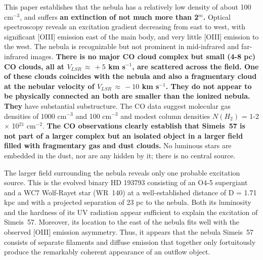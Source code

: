 \documentclass{aa}
\begin{document}
This paper establishes that the nebula has a relatively low density of
about 100 cm$^{-3 }$, and suffers {\bf an extinction of not much more
  than 2$^{m}$.}  Optical spectroscopy reveals an excitation gradient
decreasing from east to west, with significant [OIII] emission east of
the main body, and very little [OIII] emission to the west. The nebula
is recognizable but not prominent in mid-infrared and far-infrared
images.  {\bf There is no major CO cloud complex but small (4-8 pc) CO
  clouds, all at $V_{LSR}\,\approx\,+5$ km s$^{-1}$, are scattered
  across the field. One of these clouds coincides with the nebula and
  also a fragmentary cloud at the nebular velocity of
  $V_{LSR}\,\approx\,-10$ km s$^{-1}$. They do not appear to be
  physically connected an both are smaller than the ionized
  nebula. They} have substantial substructure. The CO data suggest
molecular gas densities of 1000 cm$^{-3}$ and 100 cm$^{-3}$ and modest
column densities $N(H_{2})$ = 1-2 $\times$ 10$^{21}$ cm$^{-2}$. {\bf
  The CO observations clearly establish that Simeis~57 is not part of
  a larger complex but an isolated object in a larger field filled with
  fragmentary gas and dust clouds.} No luminous stars are embedded in
the dust, nor are any hidden by it; there is no central source.

The larger field surrounding the nebula reveals only one probable
excitation source. This is the evolved binary HD 193793 consisting of
an O4-5 supergiant and a WC7 Wolf-Rayet star (WR~140) at a
well-established distance of D = 1.71 kpc and with a projected
separation of 23 pc to the nebula. Both its luminosity and the
hardness of its UV radiation appear sufficient to explain the
excitation of Simeis~57. Moreover, its location to the east of the
nebula fits well with the observed [OIII] emission asymmetry. Thus, it
appears that the nebula Simeis~57 consists of separate filaments and
diffuse emission that together only fortuitously produce the
remarkably coherent appearance of an outflow object.
\end{document}
